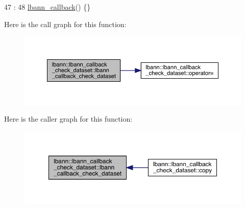 \begin{DoxyCode}
47                                  :
48     \hyperlink{classlbann_1_1lbann__callback_a679057298a41ddd47f08c157f756c584}{lbann\_callback}() \{\}
\end{DoxyCode}
Here is the call graph for this function\+:\nopagebreak
\begin{figure}[H]
\begin{center}
\leavevmode
\includegraphics[width=350pt]{classlbann_1_1lbann__callback__check__dataset_a79beae9767b50f7141bc5209ef5d696f_cgraph}
\end{center}
\end{figure}
Here is the caller graph for this function\+:\nopagebreak
\begin{figure}[H]
\begin{center}
\leavevmode
\includegraphics[width=350pt]{classlbann_1_1lbann__callback__check__dataset_a79beae9767b50f7141bc5209ef5d696f_icgraph}
\end{center}
\end{figure}
\mbox{\label{classlbann_1_1lbann__callback__check__dataset_a453a843f6506051881b334760817467f}} 
